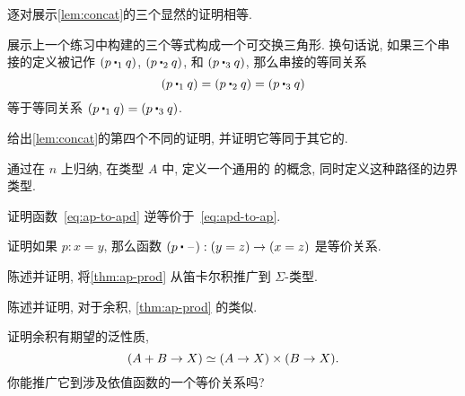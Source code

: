 \sectionExercises

\begin{ex}
    \label{ex:basics:concat}
    逐对展示\cref{lem:concat}的三个显然的证明相等.
\end{ex}

\begin{ex}
    \label{ex:eq-proofs-commute}
    展示上一个练习中构建的三个等式构成一个可交换三角形.
    换句话说, 如果三个串接的定义被记作 $(p \mathbin{\ct_1} q)$, $(p\mathbin{\ct_2} q)$, 和 $(p\mathbin{\ct_3} q)$, 那么串接的等同关系
    \[(p\mathbin{\ct_1} q) = (p\mathbin{\ct_2} q) = (p\mathbin{\ct_3} q)\]
    等于等同关系 $(p\mathbin{\ct_1} q) = (p\mathbin{\ct_3} q)$.
\end{ex}

\begin{ex}
    \label{ex:fourth-concat}
    给出\cref{lem:concat}的第四个不同的证明, 并证明它等同于其它的.
\end{ex}

\begin{ex}
    \label{ex:npaths}
    通过在 $n$ 上归纳, 在类型 $A$ 中, 定义一个通用的  的概念, 同时定义这种路径的边界类型.
\end{ex}

\begin{ex}
    \label{ex:ap-to-apd-equiv-apd-to-ap}
    证明函数~\eqref{eq:ap-to-apd} 逆等价于~\eqref{eq:apd-to-ap}.
\end{ex}

\begin{ex}
    \label{ex:equiv-concat}
    证明如果 $p:x=y$, 那么函数 $(p\ct \blank):(y=z) \to (x=z)$ 是等价关系.
\end{ex}

\begin{ex}
    \label{ex:ap-sigma}
    陈述并证明, 将\cref{thm:ap-prod} 从笛卡尔积推广到 $\Sigma$-类型.
\end{ex}

\begin{ex}
    \label{ex:ap-coprod}
    陈述并证明, 对于余积, \cref{thm:ap-prod} 的类似.
\end{ex}

\begin{ex}
    \label{ex:coprod-ump}
    证明余积有期望的泛性质,
    \[ (A+B \to X) \simeq (A\to X)\times (B\to X). \]
    你能推广它到涉及依值函数的一个等价关系吗?
\end{ex}

